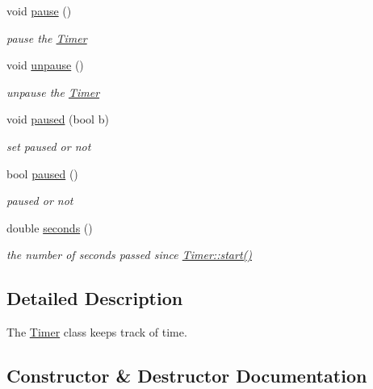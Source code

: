 \begin{DoxyCompactItemize}
void \hyperlink{class_timer_a0289effad7b573c508bc27e405900a23}{pause} ()
\begin{DoxyCompactList}\small\item\em pause the \hyperlink{class_timer}{Timer} \end{DoxyCompactList}\item 
\mbox{\label{class_timer_aa4dd50d7ed48ac73efed2950749d35d6}} 
void \hyperlink{class_timer_aa4dd50d7ed48ac73efed2950749d35d6}{unpause} ()
\begin{DoxyCompactList}\small\item\em unpause the \hyperlink{class_timer}{Timer} \end{DoxyCompactList}\item 
\mbox{\label{class_timer_a6d78b6933862786b1851fef22489245c}} 
void \hyperlink{class_timer_a6d78b6933862786b1851fef22489245c}{paused} (bool b)
\begin{DoxyCompactList}\small\item\em set paused or not \end{DoxyCompactList}\item 
\mbox{\label{class_timer_a058dd4c31bf7af5a0282c405e3af4d7a}} 
bool \hyperlink{class_timer_a058dd4c31bf7af5a0282c405e3af4d7a}{paused} ()
\begin{DoxyCompactList}\small\item\em paused or not \end{DoxyCompactList}\item 
double \hyperlink{class_timer_a045bb982f9132c9043fb10be01370485}{seconds} ()
\begin{DoxyCompactList}\small\item\em the number of seconds passed since \hyperlink{class_timer_a3a8b5272198d029779dc9302a54305a8}{Timer\+::start()} \end{DoxyCompactList}\end{DoxyCompactItemize}


\subsection{Detailed Description}
The \hyperlink{class_timer}{Timer} class keeps track of time. 

\subsection{Constructor \& Destructor Documentation}
\mbox{\label{class_timer_a5f16e8da27d2a5a5242dead46de05d97}} 
